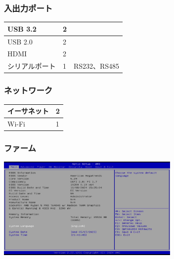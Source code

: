   \begin{frame}
    \frametitle{入出力ポート} 
    \begin{center}
      \begin{tabular}{l|l|l}
        \hline
        USB 3.2 & 2 & \\ \hline
        USB 2.0 & 2 & \\ \hline
        HDMI & 2 & \\ \hline
        シリアルポート & 1 & RS232、RS485 \\
        \hline
      \end{tabular}
    \end{center}
  \end{frame}
  \begin{frame}
    \frametitle{ネットワーク} 
    \begin{center}    
      \begin{tabular}{l|l}
        \hline
        イーサネット& 2 \\ \hline
        Wi-Fi & 1 \\
        \hline
      \end{tabular}
    \end{center}
  \end{frame}
  \begin{frame}
    \frametitle{ファーム}
    \begin{center}
    \includegraphics[height=5cm]{img/bios-display-1.jpg}
    \end{center}
  \end{frame}

